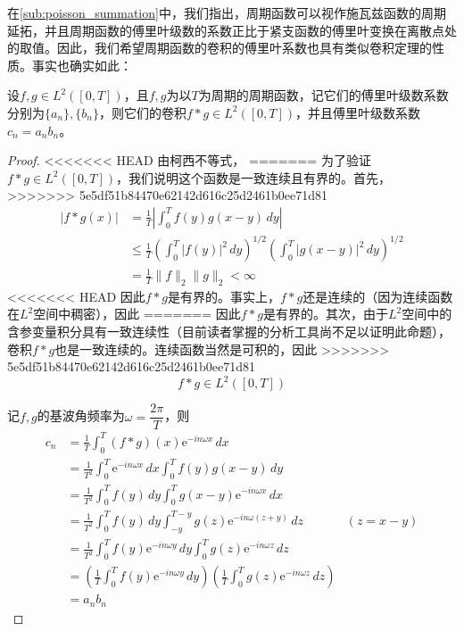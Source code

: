 在\ref{sub:poisson_summation}中，我们指出，周期函数可以视作施瓦兹函数的周期延拓，并且周期函数的傅里叶级数的系数正比于紧支函数的傅里叶变换在离散点处的取值。因此，我们希望周期函数的卷积的傅里叶系数也具有类似卷积定理的性质。事实也确实如此：
\begin{theorem}[周期函数的卷积定理]
    设$f,g\in L^2([0,T])$，且$f,g$为以$T$为周期的周期函数，记它们的傅里叶级数系数分别为$\{a_n\},\{b_n\}$，则它们的卷积$f*g\in L^2([0,T])$，并且傅里叶级数系数$c_n=a_n b_n$。
\end{theorem}
\begin{proof}
<<<<<<< HEAD
    由柯西不等式，
=======
    为了验证$f*g\in L^2([0,T])$，我们说明这个函数是一致连续且有界的。首先，
>>>>>>> 5e5df51b84470e62142d616c25d2461b0ee71d81
    \begin{align*}
        |f*g(x)|&=\frac{1}{T}\left|\int_0^{T}f(y)g(x-y)\,dy\right|\\
        &\leq \frac{1}{T}\left(\int_0^{T}|f(y)|^2\,dy\right)^{1/2}\left(\int_0^{T}|g(x-y)|^2\,dy\right)^{1/2}\\
        &=\frac{1}{T}\|f\|_2\|g\|_2<\infty
    \end{align*}
<<<<<<< HEAD
    因此$f*g$是有界的。事实上，$f*g$还是连续的（因为连续函数在$L^2$空间中稠密），因此
=======
    因此$f*g$是有界的。其次，由于$L^2$空间中的含参变量积分具有一致连续性（目前读者掌握的分析工具尚不足以证明此命题），卷积$f*g$也是一致连续的。连续函数当然是可积的，因此
>>>>>>> 5e5df51b84470e62142d616c25d2461b0ee71d81
    $$f*g\in L^2([0,T])$$

    记$f,g$的基波角频率为$\omega=\dfrac{2\pi}{T}$，则
    \begin{align*}
        c_n&=\frac{1}{T}\int_0^{T}(f*g)(x)\mathrm{e}^{-in\omega x}\,dx\\
        &=\frac{1}{T^2}\int_0^{T}\mathrm{e}^{-in\omega x}\,dx\int_0^{T}f(y)g(x-y)\,dy\\
        &=\frac{1}{T^2}\int_0^{T}f(y)\,dy\int_0^{T}g(x-y)\mathrm{e}^{-in\omega x}\,dx\\
        &=\frac{1}{T^2}\int_0^{T}f(y)\,dy\int_{-y}^{T-y}g(z)\mathrm{e}^{-in\omega (z+y)}\,dz&(z=x-y)\\
        &=\frac{1}{T^2}\int_0^{T}f(y)\mathrm{e}^{-in\omega y}\,dy\int_0^{T}g(z)\mathrm{e}^{-in\omega z}\,dz\\
        &=\left(\frac{1}{T}\int_0^{T}f(y)\mathrm{e}^{-in\omega y}\,dy\right)\left(\frac{1}{T}\int_0^{T}g(z)\mathrm{e}^{-in\omega z}\,dz\right)\\
        &=a_n b_n
    \end{align*}
\end{proof}

